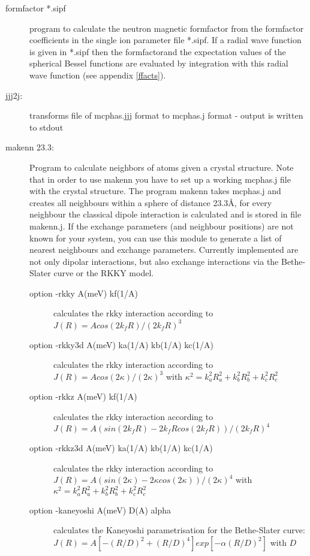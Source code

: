 \begin{description}
\item[\prg formfactor *.sipf] program to calculate the neutron magnetic formfactor
from the formfactor coefficients in the single ion parameter file *.sipf. If a radial wave function is given in *.sipf
then the formfactorand the expectation values of the spherical Bessel functions  are evaluated by integration
with this radial wave function (see appendix \ref{ffacts}).
\item [\prg jjj2j:] transforms file of {\prg mcphas.jjj} format to {\prg %
mcphas.j} format
- output is written to stdout

\item[\prg makenn 23.3:] Program to calculate neighbors of atoms given a crystal structure.
Note that in order to use {\prg makenn} you have to set up a 
working {\prg mcphas.j} file with the crystal structure. 
The program {\prg makenn} takes {\prg mcphas.j} and
creates all neighbours within a sphere of distance 23.3\AA, for every neighbour the classical
dipole interaction is calculated and is stored in file {\prg makenn.j}. If the exchange %
parameters 
(and neighbour positions) are not known for your system, you can use this module 
to generate a list of nearest neighbours and exchange parameters. Currently implemented 
 are not only dipolar interactions, but also exchange interactions via the Bethe-Slater 
curve or the RKKY model. 
\begin{description}
\item[option {\prg -rkky A(meV) kf(1/A)}] calculates the rkky interaction according to $J(R)=A %
cos(2 k_f R)/(2 k_f R)^3$
\item[option {\prg -rkky3d A(meV) ka(1/A) kb(1/A) kc(1/A)}] calculates the rkky interaction %
according to $J(R)=A cos(2 \kappa)/(2 \kappa)^3$ with $\kappa^2=k_a^2 R_a^2 + k_b^2 R_b^2 + %
k_c^2 R_c^2$
\item[option {\prg -rkkz A(meV) kf(1/A)}] calculates the rkky interaction according to $J(R)=A %
(sin(2 k_f R)- 2 k_f R cos(2 k_f R))/(2 k_f R)^4$
\item[option {\prg -rkkz3d A(meV) ka(1/A) kb(1/A) kc(1/A)}] calculates the rkky interaction %
according to $J(R)=A (sin(2 \kappa)- 2 \kappa cos(2 \kappa))/(2 \kappa)^4$ with $\kappa^2=k_a^2 %
R_a^2 + k_b^2 R_b^2 + k_c^2 R_c^2$
\item[option {\prg -kaneyoshi A(meV) D(A) alpha}] calculates the Kaneyoshi parametrisation for %
the Bethe-Slater
                               curve: $J(R)= A [-(R/D)^2+(R/D)^4]exp[-\alpha (R/D)^2]$  with $D$ %

\end{description}
\end{description}
